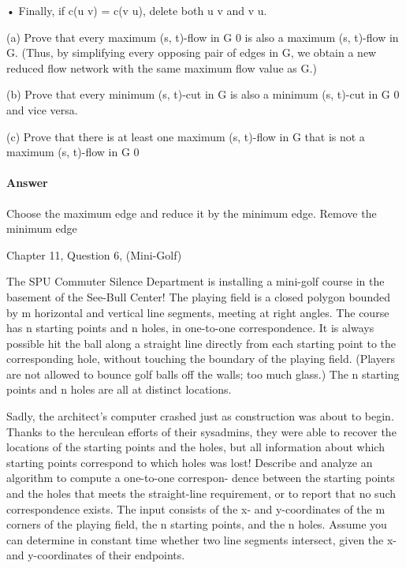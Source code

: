 \documentclass{article}
\begin{document}
• Finally, if c(u  v) = c(v  u), delete both u  v and v  u.

(a) Prove that every maximum (s, t)-flow in G 0 is also a maximum (s, t)-flow
in G. (Thus, by simplifying every opposing pair of edges in G, we obtain
a new reduced flow network with the same maximum flow value as G.)

(b) Prove that every minimum (s, t)-cut in G is also a minimum (s, t)-cut
in G 0 and vice versa.

(c) Prove that there is at least one maximum (s, t)-flow in G that is not a
maximum (s, t)-flow in G 0

\paragraph{Answer}

Choose the maximum edge and reduce it by the minimum edge. Remove the minimum edge


\collab{\todo{}}
\nextprob{}

Chapter 11, Question 6, (Mini-Golf)

The SPU Commuter Silence Department is installing a mini-golf course in
the basement of the See-Bull Center! The playing field is a closed polygon
bounded by m horizontal and vertical line segments, meeting at right angles.
The course has n starting points and n holes, in one-to-one correspondence.
It is always possible hit the ball along a straight line directly from each
starting point to the corresponding hole, without touching the boundary
of the playing field. (Players are not allowed to bounce golf balls off the
walls; too much glass.) The n starting points and n holes are all at distinct
locations.

Sadly, the architect’s computer crashed just as construction was about to
begin. Thanks to the herculean efforts of their sysadmins, they were able to
recover the locations of the starting points and the holes, but all information
about which starting points correspond to which holes was lost!
Describe and analyze an algorithm to compute a one-to-one correspon-
dence between the starting points and the holes that meets the straight-line
requirement, or to report that no such correspondence exists. The input
consists of the x- and y-coordinates of the m corners of the playing field, the
n starting points, and the n holes. Assume you can determine in constant
time whether two line segments intersect, given the x- and y-coordinates
of their endpoints.
\end{document}

